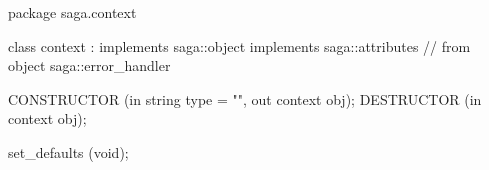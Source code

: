  
 \begin{myspec}
  package saga.context
  {
    class context : implements   saga::object
                    implements   saga::attributes
                 // from object  saga::error_handler
    {
      CONSTRUCTOR      (in  string       type = "",
                        out context      obj);
      DESTRUCTOR       (in  context      obj);
 
      set_defaults     (void);                   
    }
  }
 \end{myspec}
 
